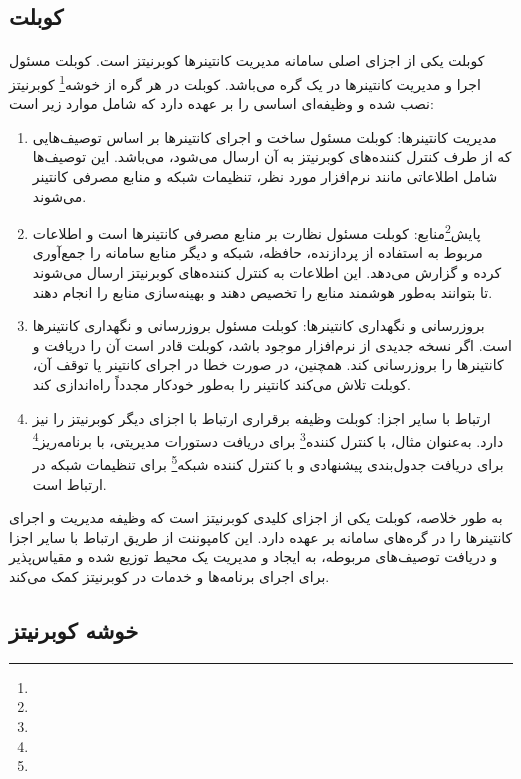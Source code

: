 \subsection{کوبلت}
\label{subsec:kubelet}
\paragraph{}
{
    کوبلت
    یکی از اجزای اصلی سامانه مدیریت کانتینرها کوبرنیتز است. کوبلت مسئول اجرا و مدیریت کانتینرها در یک
    گره
    می‌باشد. کوبلت در هر گره از
    خوشه\footnote{}
    کوبرنیتز نصب شده و وظیفه‌ای اساسی را بر عهده دارد که شامل موارد زیر است:
    \begin{enumerate}
        \item مدیریت کانتینرها: کوبلت مسئول ساخت و اجرای کانتینرها بر اساس توصیف‌هایی که از طرف کنترل کننده‌های کوبرنیتز به آن ارسال می‌شود، می‌باشد. این توصیف‌ها شامل اطلاعاتی مانند نرم‌افزار مورد نظر، تنظیمات شبکه و منابع مصرفی کانتینر می‌شوند.
        \item پایش\footnote{}منابع: کوبلت مسئول نظارت بر منابع مصرفی کانتینرها است و اطلاعات مربوط به استفاده از پردازنده، حافظه، شبکه و دیگر منابع سامانه را جمع‌آوری کرده و گزارش می‌دهد. این اطلاعات به کنترل کننده‌های کوبرنیتز ارسال می‌شوند تا بتوانند به‌طور هوشمند منابع را تخصیص دهند و بهینه‌سازی منابع را انجام دهند.
        \item بروزرسانی و نگهداری کانتینرها: کوبلت مسئول بروزرسانی و نگهداری کانتینرها است. اگر نسخه جدیدی از نرم‌افزار موجود باشد، کوبلت قادر است آن را دریافت و کانتینرها را بروزرسانی کند. همچنین، در صورت خطا در اجرای کانتینر یا توقف آن، کوبلت تلاش می‌کند کانتینر را به‌طور خودکار مجدداً راه‌اندازی کند.
        \item ارتباط با سایر اجزا: کوبلت وظیفه برقراری ارتباط با اجزای دیگر کوبرنیتز را نیز دارد. به‌عنوان مثال، با کنترل کننده\footnote{} برای دریافت دستورات مدیریتی، با برنامه‌ریز\footnote{} برای دریافت جدول‌بندی پیشنهادی و با کنترل کننده شبکه\footnote{} برای تنظیمات شبکه در ارتباط است.
    \end{enumerate}
    به طور خلاصه، کوبلت یکی از اجزای کلیدی کوبرنیتز است که وظیفه مدیریت و اجرای کانتینرها را در گره‌های سامانه بر عهده دارد. این کامپوننت از طریق ارتباط با سایر اجزا و دریافت توصیف‌های مربوطه، به ایجاد و مدیریت یک محیط توزیع شده و مقیاس‌پذیر برای اجرای برنامه‌ها و خدمات در کوبرنیتز کمک می‌کند.
}

\subsection{خوشه کوبرنیتز}
\label{subsec:kube_cluster}
